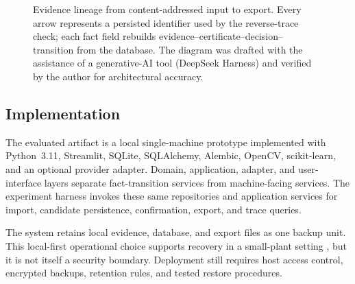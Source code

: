 \begin{figure}[!ht]
  \centering
  \resizebox{0.96\textwidth}{!}{}
  \caption{Evidence lineage from content-addressed input to export. Every arrow represents a persisted identifier used by the reverse-trace check; each fact field rebuilds evidence--certificate--decision--transition from the database. The diagram was drafted with the assistance of a generative-AI tool (DeepSeek Harness) and verified by the author for architectural accuracy.}
  \label{fig:lineage}
\end{figure}

\subsection{Implementation}
The evaluated artifact is a local single-machine prototype implemented with Python~3.11, Streamlit, SQLite, SQLAlchemy, Alembic, OpenCV, scikit-learn, and an optional provider adapter. Domain, application, adapter, and user-interface layers separate fact-transition services from machine-facing services. The experiment harness invokes these same repositories and application services for import, candidate persistence, confirmation, export, and trace queries.

The system retains local evidence, database, and export files as one backup unit. This local-first operational choice supports recovery in a small-plant setting \citep{kleppmann2019}, but it is not itself a security boundary. Deployment still requires host access control, encrypted backups, retention rules, and tested restore procedures.
